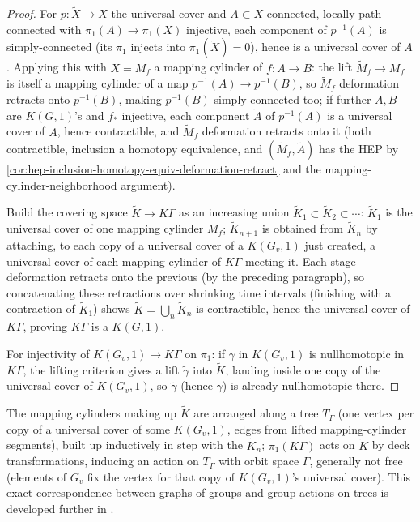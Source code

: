 \begin{proof}
For $p:\tilde X\to X$ the universal cover and $A\subset X$ connected, locally
path-connected with $\pi_1(A)\to\pi_1(X)$ injective, each component of $p^{-1}(A)$ is
simply-connected (its $\pi_1$ injects into $\pi_1(\tilde X)=0$), hence is a universal cover
of $A$. Applying this with $X=M_f$ a mapping cylinder of $f:A\to B$: the lift
$\tilde M_f\to M_f$ is itself a mapping cylinder of a map $p^{-1}(A)\to p^{-1}(B)$, so
$\tilde M_f$ deformation retracts onto $p^{-1}(B)$, making $p^{-1}(B)$ simply-connected
too; if further $A,B$ are $K(G,1)$'s and $f_*$ injective, each component $\tilde A$ of
$p^{-1}(A)$ is a universal cover of $A$, hence contractible, and $\tilde M_f$ deformation
retracts onto it (both contractible, inclusion a homotopy equivalence, and
$(\tilde M_f,\tilde A)$ has the HEP by \cref{cor:hep-inclusion-homotopy-equiv-deformation-retract}
and the mapping-cylinder-neighborhood argument).

Build the covering space $\tilde K\to K\Gamma$ as an increasing union
$\tilde K_1\subset\tilde K_2\subset\cdots$: $\tilde K_1$ is the universal cover of one mapping
cylinder $M_f$; $\tilde K_{n+1}$ is obtained from $\tilde K_n$ by attaching, to each copy of a
universal cover of a $K(G_v,1)$ just created, a universal cover of each mapping
cylinder of $K\Gamma$ meeting it. Each stage deformation retracts onto the previous
(by the preceding paragraph), so concatenating these retractions over shrinking
time intervals (finishing with a contraction of $\tilde K_1$) shows $\tilde K=\bigcup_n\tilde K_n$ is
contractible, hence the universal cover of $K\Gamma$, proving $K\Gamma$ is a $K(G,1)$.

For injectivity of $K(G_v,1)\to K\Gamma$ on $\pi_1$: if $\gamma$ in $K(G_v,1)$ is nullhomotopic
in $K\Gamma$, the lifting criterion gives a lift $\tilde\gamma$ into $\tilde K$, landing inside one copy
of the universal cover of $K(G_v,1)$, so $\tilde\gamma$ (hence $\gamma$) is already nullhomotopic
there.
\end{proof}

The mapping cylinders making up $\tilde K$ are arranged along a tree $T_\Gamma$ (one vertex
per copy of a universal cover of some $K(G_v,1)$, edges from lifted mapping-cylinder
segments), built up inductively in step with the $\tilde K_n$; $\pi_1(K\Gamma)$ acts on $\tilde K$ by
deck transformations, inducing an action on $T_\Gamma$ with orbit space $\Gamma$, generally
not free (elements of $G_v$ fix the vertex for that copy of $K(G_v,1)$'s universal cover).
This exact correspondence between graphs of groups and group actions on trees is
developed further in \cite{ScottWall1979}.


